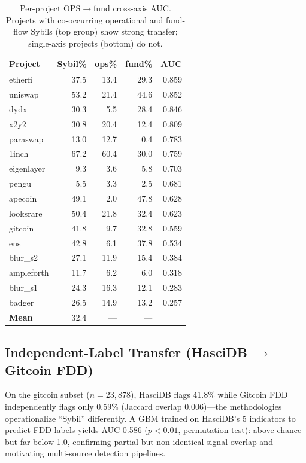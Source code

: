 \documentclass[sigconf,nonacm=false]{acmart}
\begin{document}
\begin{table}[t]
\caption{Per-project OPS$\to$fund cross-axis AUC. Projects with co-occurring operational and fund-flow Sybils (top group) show strong transfer; single-axis projects (bottom) do not.}
\label{tab:crossaxis_perproject}
\small
\begin{tabular}{lrrrr}
\toprule
Project & Sybil\% & ops\% & fund\% & AUC \\
\midrule
etherfi     & 37.5 & 13.4 & 29.3 & 0.859 \\
uniswap     & 53.2 & 21.4 & 44.6 & 0.852 \\
dydx        & 30.3 & 5.5  & 28.4 & 0.846 \\
x2y2        & 30.8 & 20.4 & 12.4 & 0.809 \\
paraswap    & 13.0 & 12.7 & 0.4  & 0.783 \\
1inch       & 67.2 & 60.4 & 30.0 & 0.759 \\
eigenlayer  & 9.3  & 3.6  & 5.8  & 0.703 \\
pengu       & 5.5  & 3.3  & 2.5  & 0.681 \\
apecoin     & 49.1 & 2.0  & 47.8 & 0.628 \\
looksrare   & 50.4 & 21.8 & 32.4 & 0.623 \\
gitcoin     & 41.8 & 9.7  & 32.8 & 0.559 \\
ens         & 42.8 & 6.1  & 37.8 & 0.534 \\
blur\_s2    & 27.1 & 11.9 & 15.4 & 0.384 \\
ampleforth  & 11.7 & 6.2  & 6.0  & 0.318 \\
blur\_s1    & 24.3 & 16.3 & 12.1 & 0.283 \\
badger      & 26.5 & 14.9 & 13.2 & 0.257 \\
\midrule
\textbf{Mean} & 32.4 & --- & --- & \textbf{\largeScaleCrossAxisGbmMeanAuc{}} \\
\bottomrule
\end{tabular}
\end{table}

\subsection{Independent-Label Transfer (HasciDB $\to$ Gitcoin FDD)}
\label{sec:fdd}

On the gitcoin subset ($n{=}23{,}878$), HasciDB flags 41.8\% while Gitcoin FDD independently flags only 0.59\% (Jaccard overlap 0.006)---the methodologies operationalize ``Sybil'' differently.
A GBM trained on HasciDB's 5 indicators to predict FDD labels yields AUC 0.586 ($p{<}0.01$, permutation test): above chance but far below 1.0, confirming partial but non-identical signal overlap and motivating multi-source detection pipelines.
\end{document}
